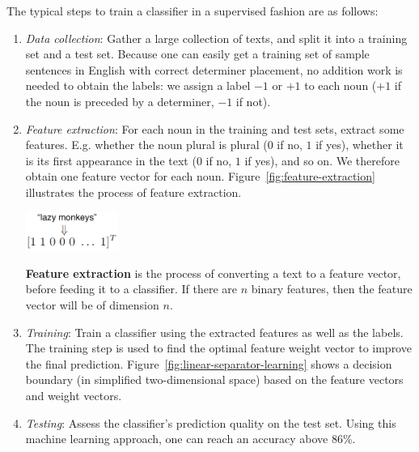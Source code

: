 \documentclass[justified, marginals=justified]{tufte-handout}
\begin{document}
\medskip

The typical steps to train a classifier in a supervised fashion are as follows:


\begin{enumerate}
\item \textit{Data collection}: Gather a large collection of texts, and split it into a training set and a test set. Because one can easily get a training set of sample sentences in English with correct determiner placement, no addition work is needed to obtain the labels: we assign a label $-1$ or $+1$ to each noun ($+1$ if the noun is preceded by a determiner, $-1$ if not).
\item \textit{Feature extraction}: For each noun in the training and test sets, extract some features. E.g. whether the noun plural is plural ($0$ if no, $1$ if yes), whether it is its first appearance in the text ($0$ if no, $1$ if yes), and so on. We therefore obtain one feature vector for each noun. Figure~\ref{fig:feature-extraction} illustrates the process of feature extraction.
\begin{marginfigure}[-3cm]%
\centering
  \includegraphics[width=3cm]{feature-extraction.png}
  \caption{\textbf{Feature extraction} is the process of converting a text to a feature vector, before feeding it to a classifier. If there are $n$ binary features, then the feature vector will be of dimension $n$.}
  \label{fig:feature-extraction}
\end{marginfigure}
\item \textit{Training}: Train a classifier using the extracted features as well as the labels. The training step is used to find the optimal feature weight vector to improve the final prediction. Figure~\ref{fig:linear-separator-learning} shows a decision boundary (in simplified two-dimensional space) based on the feature vectors and weight vectors.
\item \textit{Testing}: Assess the classifier's prediction quality on the test set. Using this machine learning approach, one can reach an accuracy above 86\%.
\end{enumerate}
\end{document}
